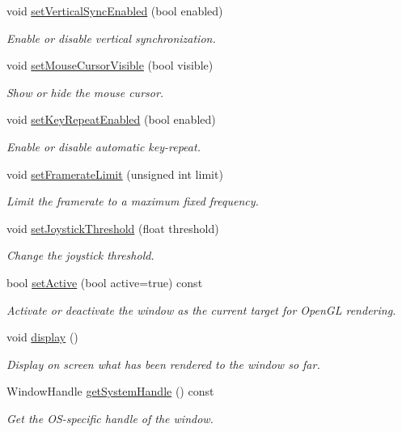 \begin{DoxyCompactItemize}
void \hyperlink{classsf_1_1Window_a59041c4556e0351048f8aff366034f61}{set\-Vertical\-Sync\-Enabled} (bool enabled)
\begin{DoxyCompactList}\small\item\em Enable or disable vertical synchronization. \end{DoxyCompactList}\item 
void \hyperlink{classsf_1_1Window_aad3991c25e0a83afbb4d62febf9b7b14}{set\-Mouse\-Cursor\-Visible} (bool visible)
\begin{DoxyCompactList}\small\item\em Show or hide the mouse cursor. \end{DoxyCompactList}\item 
void \hyperlink{classsf_1_1Window_aef9f2b14c10ecba8a8df95dd51c5bb73}{set\-Key\-Repeat\-Enabled} (bool enabled)
\begin{DoxyCompactList}\small\item\em Enable or disable automatic key-\/repeat. \end{DoxyCompactList}\item 
void \hyperlink{classsf_1_1Window_af4322d315baf93405bf0d5087ad5e784}{set\-Framerate\-Limit} (unsigned int limit)
\begin{DoxyCompactList}\small\item\em Limit the framerate to a maximum fixed frequency. \end{DoxyCompactList}\item 
void \hyperlink{classsf_1_1Window_aa45b8f54e29a6f59f1fc7ee66b2fab68}{set\-Joystick\-Threshold} (float threshold)
\begin{DoxyCompactList}\small\item\em Change the joystick threshold. \end{DoxyCompactList}\item 
bool \hyperlink{classsf_1_1Window_a17ccf8ece0ce0bf2f1e6698bcfa29731}{set\-Active} (bool active=true) const 
\begin{DoxyCompactList}\small\item\em Activate or deactivate the window as the current target for Open\-G\-L rendering. \end{DoxyCompactList}\item 
void \hyperlink{classsf_1_1Window_adabf839cb103ac96cfc82f781638772a}{display} ()
\begin{DoxyCompactList}\small\item\em Display on screen what has been rendered to the window so far. \end{DoxyCompactList}\item 
Window\-Handle \hyperlink{classsf_1_1Window_a26368e7162229f8637c34d80ab0f138e}{get\-System\-Handle} () const 
\begin{DoxyCompactList}\small\item\em Get the O\-S-\/specific handle of the window. \end{DoxyCompactList}\end{DoxyCompactItemize}
